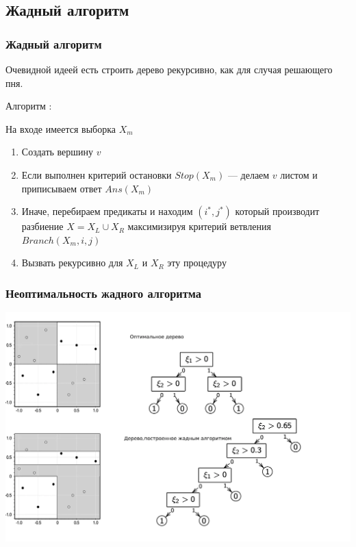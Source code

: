 \documentclass{beamer}
\begin{document}
	\subsection{Жадный алгоритм}

	\begin{frame}
		\frametitle{Жадный алгоритм}

		Очевидной идеей есть строить дерево рекурсивно, как для случая решающего пня.

		\vspace{15pt}

		Алгоритм :

		На входе имеется выборка $X_m$
		\begin{enumerate}
			\item Создать вершину $v$
			\item Если выполнен критерий остановки $Stop(X_m)$ --- делаем $v$ листом и приписываем ответ $Ans(X_m)$
			\item Иначе, перебираем предикаты и находим $(i^*, j^*)$ который производит разбиение $X = X_L \cup X_R$ максимизируя
			критерий ветвления $Branch(X_m, i, j)$
			\item Вызвать рекурсивно для $X_L$ и $X_R$ эту процедуру
		\end{enumerate}
	\end{frame}

	\begin{frame}
		\frametitle{Неоптимальность жадного алгоритма}

		\includegraphics[width=1\textwidth]{not_optimal}
	\end{frame}
	
\end{document}
